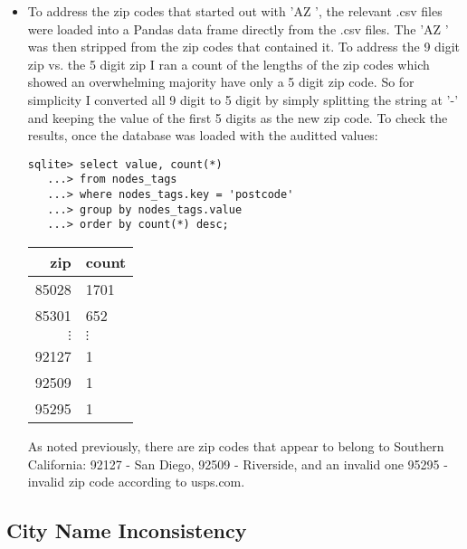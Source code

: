 \documentclass{article}
\begin{document}
\begin{itemize}
\item To address the zip codes that started out with 'AZ ', the relevant .csv files were loaded into a Pandas data frame directly from the .csv files.  The 'AZ ' was then stripped from the zip codes that contained it. To address the 9 digit zip vs. the 5 digit zip I ran a count of the lengths of the zip codes which showed an overwhelming majority have only  a 5 digit zip code.  So for simplicity I converted all 9 digit to 5 digit by simply splitting the string at '-' and keeping the value of the first 5 digits as the new zip code.  To check the results, once the database was loaded with the auditted values:

\begin{minipage}{0.5\textwidth}
\begin{verbatim}
sqlite> select value, count(*)
   ...> from nodes_tags
   ...> where nodes_tags.key = 'postcode'
   ...> group by nodes_tags.value
   ...> order by count(*) desc;
\end{verbatim}
\end{minipage}
\begin{minipage}{0.4\textwidth}
\begin{tabular}{r|l}
zip&count\\\hline
85028&1701\\
85301&652\\
$\vdots$&$\vdots$\\
92127&1\\
92509&1\\
95295&1\\
\end{tabular}
\end{minipage}

As noted previously, there are zip codes that appear to belong to Southern California: 92127 - San Diego, 92509 - Riverside, and an invalid one 95295 - invalid zip code according to usps.com.
\end{itemize}


\subsection{City Name Inconsistency}
\end{document}
